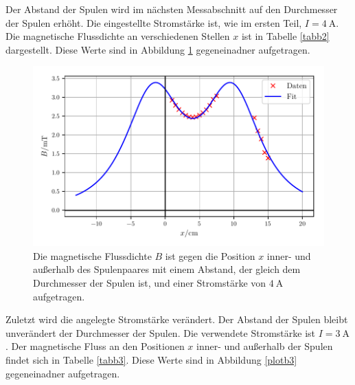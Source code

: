 \noindent

\newline
\noindent Der Abstand der Spulen wird im nächsten Messabschnitt auf den
Durchmesser der Spulen erhöht.
Die eingestellte Stromstärke ist, wie im ersten Teil,
$I = \SI{4}{\ampere}$.
Die magnetische Flussdichte an verschiedenen Stellen $x$ ist
in Tabelle \ref{tabb2} dargestellt.
Diese Werte sind in Abbildung \ref{plotb2} gegeneinadner
aufgetragen.


\begin{figure}
    \centering
    \includegraphics{build/plotb2.pdf}
    \caption{Die magnetische Flussdichte $B$ ist gegen die Position $x$ inner-
    und außerhalb des Spulenpaares mit einem Abstand, der gleich dem Durchmesser
    der Spulen ist, und einer Stromstärke von $\SI{4}{\ampere}$ aufgetragen.}
    \label{plotb2}
\end{figure}

\noindent

\noindent Zuletzt wird die angelegte Stromstärke verändert. Der Abstand
der Spulen bleibt unverändert der Durchmesser der Spulen.
Die verwendete Stromstärke ist $I = \SI{3}{\ampere}$.
Der magnetische Fluss an den Positionen $x$ inner- und außerhalb
der Spulen findet sich in Tabelle \ref{tabb3}.
Diese Werte sind in Abbildung \ref{plotb3} gegeneinadner
aufgetragen.


